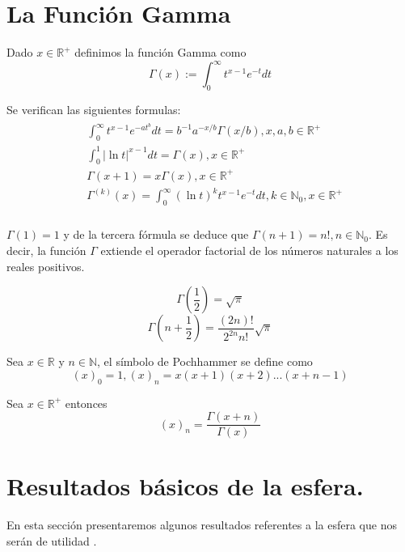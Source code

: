 
\chapter{La Función Gamma}\label{aped.A}
\begin{defn} Dado $x\in\mathds{R}^+$ definimos la función Gamma\cite[sec. 1.2]{libro_esfarm} como
	$$
	\Gamma(x) := \int_{0}^{\infty} t^{x-1}e^{-t}dt		
	$$
\end{defn}
\begin{prop}Se verifican las siguientes formulas:
	\begin{gather}
	\begin{aligned}
	&\int_{0}^{\infty}  t^{x-1}e^{-at^b}dt = b^{-1}a^{-x/b}\Gamma(x/b)  , x,a,b \in \mathds{R}^+ \\
	&\int_{0}^{1} |\ln{t}|^{x-1}dt = \Gamma(x),   x \in \mathds{R}^+  \\
	&\Gamma(x+1) = x \Gamma(x) ,		x\in \mathds{R}^+ \\
	&\Gamma^{(k)}(x) = \int_{0}^{\infty} (\ln{t})^k t^{x-1} e^{-t} dt,   k\in\mathds{N}_0,x\in\mathds{R}^+ \\
	\end{aligned}
	\end{gather}
\end{prop}
\begin{rem}
	$\Gamma(1)=1$ y de la tercera fórmula se deduce que $\Gamma(n+1)=n!, n\in\mathds{N}_0$. Es decir, la función $\Gamma$ extiende el operador factorial de los números naturales a los reales positivos.
\end{rem}
\begin{lem} 
	$$
	\Gamma(\frac{1}{2}) = 	\sqrt{\pi}
	$$
	$$
	\Gamma(n+\frac{1}{2})=\frac{(2n)!}{2^{2n}n!} \sqrt{\pi}
	$$
\end{lem}
\begin{defn}Sea $x\in\mathds{R}$ y $n\in\mathds{N}$, el símbolo de Pochhammer se define como
	$$
	(x)_0 = 1, (x)_n=x(x+1)(x+2)...(x+n-1)
	$$
\end{defn}
\begin{prop} Sea $x\in\mathds{R}^+$ entonces
	$$
	(x)_n = \frac{\Gamma(x+n)}{\Gamma(x)}
	$$
\end{prop}
\chapter{Resultados básicos de la esfera.}\label{aped.B}
En esta sección presentaremos algunos resultados referentes a la esfera que nos serán de utilidad \cite[sec 1.3]{libro_esfarm}.
\bigskip

